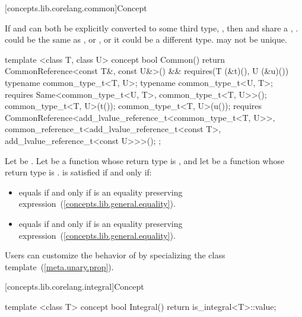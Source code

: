 [concepts.lib.corelang.common]{Concept }

\pnum
If  and  can both be explicitly converted to some third type,
, then  and  share a ,
. \enternote {} could be the same as , or , or
it could be a different type.  may not be unique.\exitnote

%
\begin{itemdecl}
template <class T, class U>
concept bool Common() {
  return CommonReference<const T&, const U&>() &&
    requires(T (&t)(), U (&u)()) {
      typename common_type_t<T, U>;
      typename common_type_t<U, T>;
      requires Same<common_type_t<U, T>, common_type_t<T, U>>();
      common_type_t<T, U>(t());
      common_type_t<T, U>(u());
      requires CommonReference<add_lvalue_reference_t<common_type_t<T, U>>,
                               common_reference_t<add_lvalue_reference_t<const T>,
                                                  add_lvalue_reference_t<const U>>>();
    };
}
\end{itemdecl}

\begin{itemdescr}
\pnum
Let  be . Let
 be a function whose return type is , and let  be a function
whose return type is .  is satisfied if and only if:
\begin{itemize}
\item {} equals  if and only if
   is an equality preserving
  expression~(\ref{concepts.lib.general.equality}).
\item {} equals  if and only if
   is an equality preserving
  expression~(\ref{concepts.lib.general.equality}).
\end{itemize}

\pnum
\enternote Users can customize the behavior of  by specializing the 
class template~(\ref{meta.unary.prop}).\exitnote

\end{itemdescr}

[concepts.lib.corelang.integral]{Concept }

%
\begin{itemdecl}
template <class T>
concept bool Integral() {
  return is_integral<T>::value;
}
\end{itemdecl}

